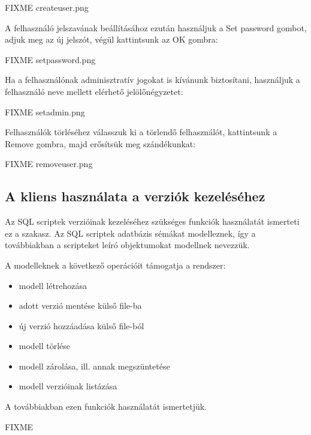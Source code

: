 \documentclass[a4paper,12pt]{article}
\begin{document}
FIXME createuser.png

A felhasználó jelszavának beállításához ezután használjuk a Set password
gombot, adjuk meg az új jelszót, végül kattintsunk az OK gombra:

FIXME setpassword.png

Ha a felhasználónak adminisztratív jogokat is kívánunk biztosítani, használjuk
a felhasználó neve mellett elérhető jelölőnégyzetet:

FIXME setadmin.png

Felhasználók törléséhez válasszuk ki a törlendő felhasználót, kattintsunk a
Remove gombra, majd erősítsük meg szándékunkat:

FIXME removeuser.png

\subsection{A kliens használata a verziók kezeléséhez}

Az SQL scriptek verzióinak kezeléséhez szükséges funkciók használatát ismerteti
ez a szakasz. Az SQL scriptek adatbázis sémákat modelleznek, így a továbbiakban
a scripteket leíró objektumokat modellnek nevezzük.

A modelleknek a következő operációit támogatja a rendszer:

\begin{itemize}
\item modell létrehozása
\item adott verzió mentése külső file-ba
\item új verzió hozzáadása külső file-ból
\item modell törlése
\item modell zárolása, ill. annak megszüntetése
\item modell verzióinak listázása
\end{itemize}

A továbbiakban ezen funkciók használatát ismertetjük.

FIXME
\end{document}
